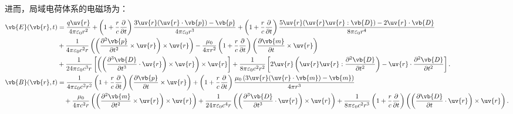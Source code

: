 进而，局域电荷体系的电磁场为：
\begin{align*}
	\vb{E}(\vb{r}, t) &= \frac{q \uv{r}}{4\pi\varepsilon_0 r^2} + \left( 1 + \frac{r}{c} \frac{\partial}{\partial t} \right) \frac{3\uv{r}(\uv{r} \cdot \vb{p}) - \vb{p}}{4\pi\varepsilon_0 r^3} + \left( 1 + \frac{r}{c} \frac{\partial}{\partial t} \right) \frac{5\uv{r}(\uv{r} \uv{r} : \vb{D}) - 2\uv{r} \cdot \vb{D}}{8\pi\varepsilon_0 r^4}
	\\
	&+ \frac{1}{4\pi\varepsilon_0 c^2 r} \left( \left( \frac{\partial^2 \vb{p}}{\partial t^2} \times \uv{r} \right) \times \uv{r} \right) - \frac{\mu_0}{4\pi r^2} \left( 1 + \frac{r}{c} \frac{\partial}{\partial t} \right) \left( \frac{\partial \vb{m}}{\partial t} \times \uv{r} \right) \\&+ \frac{1}{24\pi\varepsilon_0 c^3 r} \left[ \left( \left( \frac{\partial^3 \vb{D}}{\partial t^3} \cdot \uv{r} \right) \times \uv{r} \right) \times \uv{r} \right]
	+ \frac{1}{8\pi\varepsilon_0 c^2 r^2} \left[ 2\uv{r} \left( \uv{r} \uv{r} : \frac{\partial^2 \vb{D}}{\partial t^2} \right) - \uv{r} \cdot \frac{\partial^2 \vb{D}}{\partial t^2} \right].\\
	\vb{B}(\vb{r}, t) &= \frac{1}{4\pi\varepsilon_0 c^2 r^2} \left( 1 + \frac{r}{c} \frac{\partial}{\partial t} \right) \left( \frac{\partial \vb{p}}{\partial t} \times \uv{r} \right) + \left( 1 + \frac{r}{c} \frac{\partial}{\partial t} \right) \frac{\mu_0 \left( 3\uv{r}(\uv{r} \cdot \vb{m}) - \vb{m} \right)}{4\pi r^3}\\
	&\quad+ \frac{\mu_0}{4\pi c^2 r} \left( \left( \frac{\partial^2 \vb{m}}{\partial t^2} \times \uv{r} \right) \times \uv{r} \right) + \frac{1}{24\pi\varepsilon_0 c^4 r} \left( \left( \frac{\partial^3 \vb{D}}{\partial t^3} \cdot \uv{r} \right) \times \uv{r} \right) + \frac{1}{8\pi\varepsilon_0 c^2 r^3} \left( 1 + \frac{r}{c} \frac{\partial}{\partial t} \right) \left( \left( \frac{\partial \vb{D}}{\partial t} \cdot \uv{r} \right) \times \uv{r} \right).
\end{align*}

